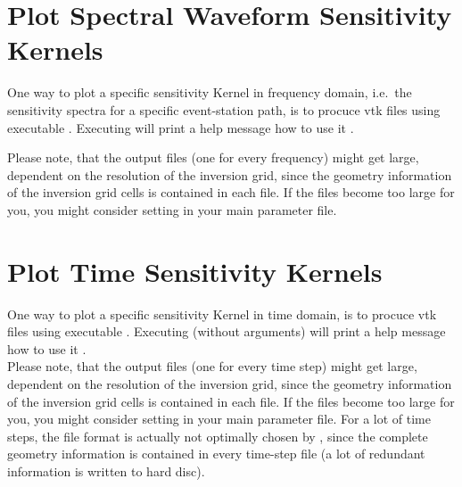 \section{Plot Spectral Waveform Sensitivity Kernels} \label{basic_steps,sec:plot_kernels}
%
One way to plot a specific sensitivity Kernel in frequency domain, i.e.\ the sensitivity spectra for a specific
event-station path, is to procuce vtk files using executable . 
Executing  will print a help message how to use it .

Please note, that the output  files (one for every frequency) might get large, dependent on the resolution 
of the inversion grid, since the geometry information of the inversion grid cells is contained in each  file.
If the files become too large for you, you might consider setting  in your 
main parameter file.
%
\section{Plot Time Sensitivity Kernels} \label{basic_steps,sec:plot_time_kernels}
%
One way to plot a specific sensitivity Kernel in time domain, is to procuce vtk files using executable . 
Executing  (without arguments) will print a help message how to use it .\\

Please note, that the output  files (one for every time step) might get large, dependent on the resolution 
of the inversion grid, since the geometry information of the inversion grid cells is contained in each  file.
If the files become too large for you, you might consider setting  in your 
main parameter file.
For a lot of time steps, the  file format is actually not optimally chosen by \ASKI, since the complete geometry
information is contained in every time-step file (a lot of redundant information is written to hard disc).
%
